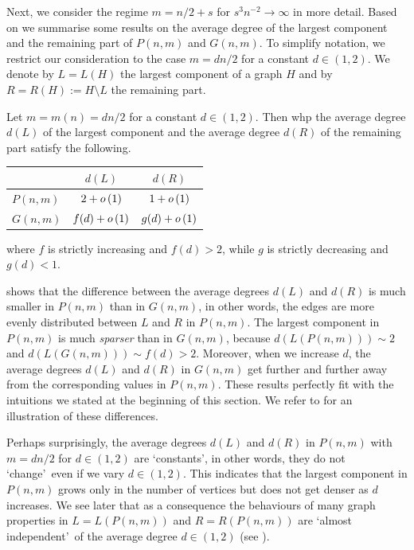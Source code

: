 Next, we consider the regime $m=n/2+s$ for $s^3n^{-2}\to \infty$ in more detail. Based on \cite{ErdoesRenyi1960,KangLuczak2012} we summarise some results on the average degree of the largest component and the remaining part of $P(n,m)$ and $G(n,m)$. To simplify notation, we restrict our consideration to the case $m=dn/2$ for a constant $d\in (1,2)$. We denote by $L=L(H)$ the largest component of a graph $H$ and by $R=R(H):=H\setminus L$ the remaining part. 

\begin{thm}\label{thm:average_degree}
Let $m=m(n)=dn/2$ for a constant $d\in (1,2)$. Then whp the average degree $d(L)$ of the largest component and the average degree $d(R)$ of the remaining part satisfy the following.
\begin{center}
\def\arraystretch{1.8}\tabcolsep=15pt
\begin{tabular}{l|c|c}
    & $d(L)$ & $d(R)$ \\[0.1cm]
    \hline
    $P(n,m)$ & $2+o\left(1\right)$ & $1+o\left(1\right)$ \\[0.1cm]
    \hline
    $G(n,m)$ & $f(d)+o\left(1\right)$  & $g(d)+o\left(1\right)$ 
\end{tabular}
\end{center}
where $f$ is strictly increasing and $f(d)>2$, while $g$ is strictly decreasing and $g(d)<1$.
\end{thm}

 shows that the difference between the average degrees $d(L)$ and $d(R)$ is much smaller in $P(n,m)$ than in $G(n,m)$, in other words, the edges are more evenly distributed between $L$ and $R$ in $P(n,m)$. The largest component in $P(n,m)$ is much {\em sparser} than in $G(n,m)$, because $d(L(P(n,m)))\sim 2$ and $d(L(G(n,m)))\sim f(d)>2$. Moreover, when we increase $d$, the average degrees $d(L)$ and $d(R)$ in $G(n,m)$ get further and further away from the corresponding values in $P(n,m)$. These results perfectly fit with the intuitions we stated at the beginning of this section. We refer to  for an illustration of these differences.

Perhaps surprisingly, the average degrees $d(L)$ and $d(R)$ in $P(n,m)$ with $m=dn/2$ for $d\in (1,2)$ are \lq constants\rq, in other words, they do not \lq change\rq\ even if we vary $d\in (1,2)$. This indicates that the largest component in $P(n,m)$ grows only in the number of vertices but does not get denser as $d$ increases. We see later that as a consequence the behaviours of many graph properties in $L=L(P(n,m))$ and $R=R(P(n,m))$ are \lq almost independent\rq\ of the average degree $d\in(1,2)$ (see ).

